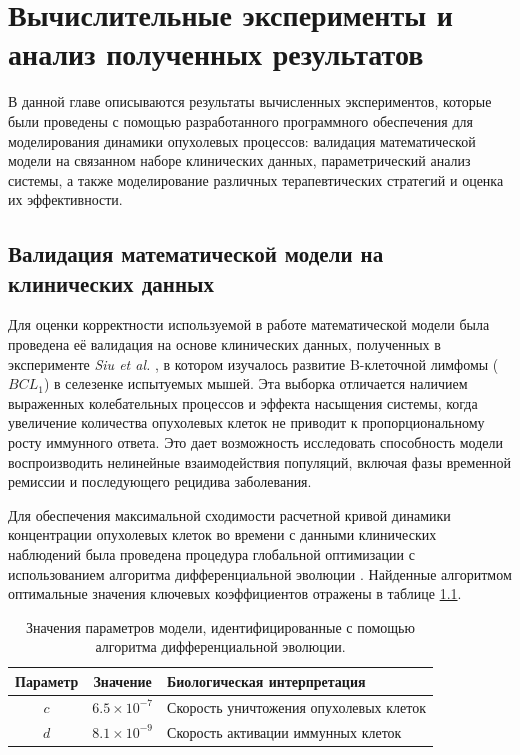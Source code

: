 \chapter{Вычислительные эксперименты и анализ полученных результатов}

В данной главе описываются результаты вычисленных экспериментов, которые были
проведены с помощью разработанного программного обеспечения для моделирования
динамики опухолевых процессов: валидация математической модели на связанном
наборе клинических данных, параметрический анализ системы, а также
моделирование различных терапевтических стратегий и оценка их эффективности.

\section{Валидация математической модели на клинических данных}

Для оценки корректности используемой в работе математической модели была
проведена её валидация на основе клинических данных, полученных в эксперименте
\textit{Siu et al.} \cite{Siu1986}, в котором изучалось развитие B-клеточной
лимфомы ($BCL_1$) в селезенке испытуемых мышей. Эта выборка отличается наличием
выраженных колебательных процессов и эффекта насыщения системы, когда
увеличение количества опухолевых клеток не приводит к пропорциональному росту
иммунного ответа. Это дает возможность исследовать способность
модели воспроизводить нелинейные взаимодействия популяций, включая
фазы временной ремиссии и последующего рецидива заболевания.

Для обеспечения максимальной сходимости расчетной кривой динамики концентрации
опухолевых клеток во времени с данными клинических наблюдений была проведена
процедура глобальной оптимизации с использованием алгоритма дифференциальной
эволюции \cite{diff_evo}. Найденные алгоритмом оптимальные значения ключевых
коэффициентов отражены в таблице \ref{tab:optimized_params}.

\begin{table}[ht!]
  \centering
  \caption{Значения параметров модели, идентифицированные с помощью алгоритма
  дифференциальной эволюции.}
  \label{tab:optimized_params}
  \begin{tabular}{|c|c|p{6cm}|}
    \hline
    Параметр & Значение & Биологическая интерпретация \\
    \hline
    $c$ & $6.5 \times 10^{-7}$ & Скорость уничтожения опухолевых клеток \\
    \hline
    $d$ & $8.1 \times 10^{-9}$ & Скорость активации иммунных клеток \\
    \hline
  \end{tabular}
\end{table}

